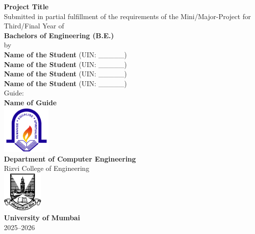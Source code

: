 \documentclass[12pt,a4paper,twoside,openright]{report}
\begin{document}
	
	\begin{titlepage}
		\centering
		\vspace*{0.2cm}
		\Huge \textbf{Project Title} \\[1cm]
		\large  {Submitted in partial fulfillment of the requirements of the Mini/Major-Project for Third/Final Year of} \\[0.5cm]
		\Large \textbf{Bachelors of Engineering (B.E.)} \\[0.5cm]
		\large by \\[0.5cm]
		\large \textbf{Name of the Student } (UIN: \_\_\_\_\_) \\
		\large \textbf{Name of the Student } (UIN: \_\_\_\_\_) \\
		\large \textbf{Name of the Student } (UIN: \_\_\_\_\_) \\
		\large \textbf{Name of the Student } (UIN: \_\_\_\_\_) \\ [1cm]
		 
		
		\large {Guide:} \\ 
		\large \textbf{Name of Guide} \\[1cm]
		
		\includegraphics[width=0.18\textwidth]{images/rcoe-logo.png}\\
		\Large \textbf{ Department of Computer Engineering} \\
		{\LARGE Rizvi College of Engineering} \\[1cm]
		
		\includegraphics[width=0.15\textwidth]{images/mu-logo.png}\\
		\LARGE \textbf{University of Mumbai} \\
		2025--2026 \\
	\end{titlepage}
	
	
	
	
	
	
	
	
\end{document}
